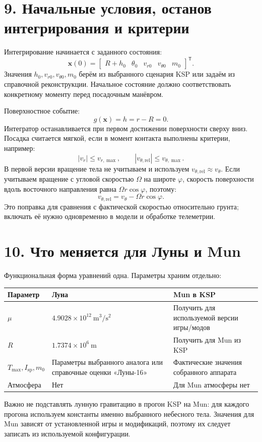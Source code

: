 \documentclass[11pt,a4paper]{article}
\newcommand{\Isp}{I_{\mathrm{sp}}}
\begin{document}
\section{9. Начальные условия, останов интегрирования и критерии}
Интегрирование начинается с заданного состояния:
\[
\mathbf x(0)=
\begin{bmatrix}
R+h_0&\theta_0&v_{r0}&v_{\theta0}&m_0
\end{bmatrix}^{\mathsf T}.
\]
Значения $h_0,v_{r0},v_{\theta0},m_0$ берём из выбранного сценария KSP или задаём из справочной реконструкции. Начальное состояние должно соответствовать конкретному моменту перед посадочным манёвром.

Поверхностное событие:
\[
g(\mathbf x)=h=r-R=0.
\]
Интегратор останавливается при первом достижении поверхности сверху вниз. Посадка считается мягкой, если в момент контакта выполнены критерии, например:
\[
|v_r|\le v_{r,\max},\qquad |v_{\theta,\mathrm{rel}}|\le v_{\theta,\max}.
\]
В первой версии вращение тела не учитываем и используем $v_{\theta,\mathrm{rel}}\approx v_\theta$. Если учитываем вращение с угловой скоростью $\Omega$ на широте $\varphi$, скорость поверхности вдоль восточного направления равна $\Omega r\cos\varphi$, поэтому:
\[
v_{\theta,\mathrm{rel}}=v_\theta-\Omega r\cos\varphi.
\]
Это поправка для сравнения с фактической скоростью относительно грунта; включать её нужно одновременно в модели и обработке телеметрии.

\section{10. Что меняется для Луны и Mun}
Функциональная форма уравнений одна. Параметры храним отдельно:
\begin{center}
\begin{tabularx}{0.96\linewidth}{@{}lXX@{}}
\toprule
Параметр & Луна & Mun в KSP\\
\midrule
$\mu$ & $4.9028\times10^{12}\ \mathrm{m^3/s^2}$ & Получить для используемой версии игры/модов\\
$R$ & $1.7374\times10^6\ \mathrm{m}$ & Получить для Mun из KSP\\
$T_{\max},\Isp,m_0$ & Параметры выбранного аналога или справочные оценки «Луны-16» & Фактические значения собранного аппарата\\
Атмосфера & Нет & Для Mun атмосферы нет\\
\bottomrule
\end{tabularx}
\end{center}
Важно не подставлять лунную гравитацию в прогон KSP на Mun: для каждого прогона используем константы именно выбранного небесного тела. Значения для Mun зависят от установленной игры и модификаций, поэтому их следует записать из используемой конфигурации.
\end{document}
